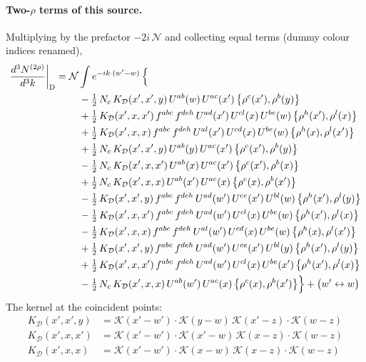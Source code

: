 \documentclass[10pt]{article}
\numberwithin{equation}{section}
\newcommand{\KK}{\mathcal K}
\newcommand{\NN}{\mathcal N}
\begin{document}
\paragraph{Two-$\rho$ terms of this source.} Multiplying by the prefactor $-2i\,\NN$ and collecting equal terms (dummy colour indices renamed),
\begin{align}
\frac{d^3N^{(2\rho)}}{d^3k}\bigg|_{\rm D}={}&\NN\int e^{-ik\cdot(w'-w)}\,\Big\{\notag\\
&\quad -\tfrac12\,N_{c}\,K_{\mathcal D}(x',x',y)\,U^{ab}(w)\,U^{ac}(x')\,\big\{\rho^{c}(x'),\rho^{b}(y)\big\}\notag\\
&\quad +\tfrac12\,K_{\mathcal D}(x',x,x')\,f^{abc}\,f^{deh}\,U^{ad}(x')\,U^{cl}(x)\,U^{be}(w)\,\big\{\rho^{h}(x'),\rho^{l}(x)\big\}\notag\\
&\quad +\tfrac12\,K_{\mathcal D}(x',x,x)\,f^{abc}\,f^{deh}\,U^{al}(x')\,U^{cd}(x)\,U^{be}(w)\,\big\{\rho^{h}(x),\rho^{l}(x')\big\}\notag\\
&\quad +\tfrac12\,N_{c}\,K_{\mathcal D}(x',x',y)\,U^{ab}(y)\,U^{ac}(x')\,\big\{\rho^{c}(x'),\rho^{b}(y)\big\}\notag\\
&\quad -\tfrac12\,N_{c}\,K_{\mathcal D}(x',x,x')\,U^{ab}(x)\,U^{ac}(x')\,\big\{\rho^{c}(x'),\rho^{b}(x)\big\}\notag\\
&\quad +\tfrac12\,N_{c}\,K_{\mathcal D}(x',x,x)\,U^{ab}(x')\,U^{ac}(x)\,\big\{\rho^{c}(x),\rho^{b}(x')\big\}\notag\\
&\quad -\tfrac12\,K_{\mathcal D}(x',x',y)\,f^{abc}\,f^{deh}\,U^{ad}(w')\,U^{ce}(x')\,U^{bl}(w)\,\big\{\rho^{h}(x'),\rho^{l}(y)\big\}\notag\\
&\quad -\tfrac12\,K_{\mathcal D}(x',x,x')\,f^{abc}\,f^{deh}\,U^{ad}(w')\,U^{cl}(x)\,U^{be}(w)\,\big\{\rho^{h}(x'),\rho^{l}(x)\big\}\notag\\
&\quad -\tfrac12\,K_{\mathcal D}(x',x,x)\,f^{abc}\,f^{deh}\,U^{al}(w')\,U^{cd}(x)\,U^{be}(w)\,\big\{\rho^{h}(x),\rho^{l}(x')\big\}\notag\\
&\quad +\tfrac12\,K_{\mathcal D}(x',x',y)\,f^{abc}\,f^{deh}\,U^{ad}(w')\,U^{ce}(x')\,U^{bl}(y)\,\big\{\rho^{h}(x'),\rho^{l}(y)\big\}\notag\\
&\quad +\tfrac12\,K_{\mathcal D}(x',x,x')\,f^{abc}\,f^{deh}\,U^{ad}(w')\,U^{cl}(x)\,U^{be}(x')\,\big\{\rho^{h}(x'),\rho^{l}(x)\big\}\notag\\
&\quad -\tfrac12\,N_{c}\,K_{\mathcal D}(x',x,x)\,U^{ab}(w')\,U^{ac}(x)\,\big\{\rho^{c}(x),\rho^{b}(x')\big\}\Big\}+\big(w'\leftrightarrow w\big)\label{eq:res-D}
\end{align}
The kernel at the coincident points:
\begin{align*}
K_{\mathcal D}(x',x',y)&=\KK(x'-w')\cdot\KK(y-w)\,\KK(x'-z)\cdot\KK(w-z)\\K_{\mathcal D}(x',x,x')&=\KK(x'-w')\cdot\KK(x'-w)\,\KK(x-z)\cdot\KK(w-z)\\K_{\mathcal D}(x',x,x)&=\KK(x'-w')\cdot\KK(x-w)\,\KK(x-z)\cdot\KK(w-z)
\end{align*}
\end{document}
